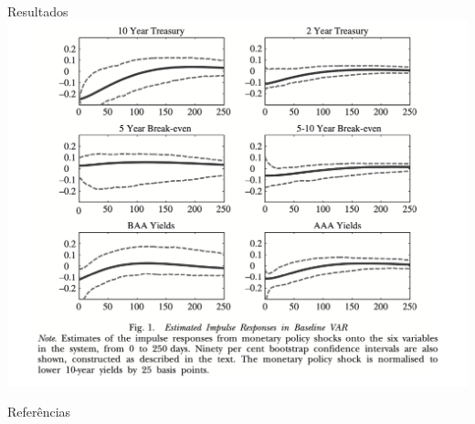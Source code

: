 \documentclass[11pt]{beamer}
\begin{document}
\begin{frame}{Resultados}
\centering
\includegraphics[scale=0.5]{plots/wright.png}
\end{frame}

\appendix
\begin{frame}[allowframebreaks]{Referências}
	\printbibliography
\end{frame}
\end{document}

